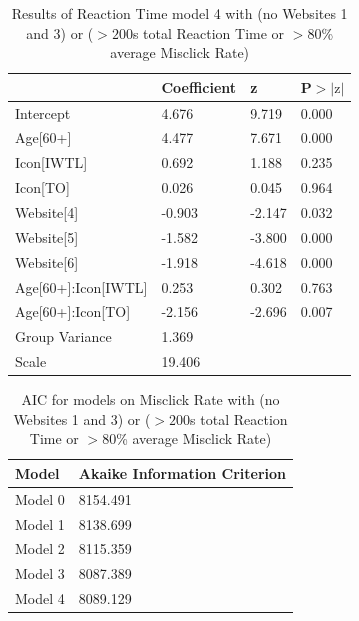 \documentclass[12pt,twoside]{reedthesis}
\begin{document}
\begin{table}[h!]
        \centering
        \begin{tabular}{| p{5cm} | p{2.5cm} | p{2.5cm} | p{2.5cm} |}
            \hline
            & Coefficient & z & P$>|\text{z}|$\\
            \hline
            Intercept & 4.676 & 9.719 & 0.000\\
            \hline
            Age[60+] & 4.477 & 7.671 & 0.000\\
            \hline
            Icon[IWTL] & 0.692 & 1.188 & 0.235\\
            \hline
            Icon[TO] & 0.026 & 0.045 & 0.964\\
            \hline
            Website[4] & -0.903 & -2.147 & 0.032\\
            \hline
            Website[5] & -1.582 & -3.800 & 0.000\\
            \hline
            Website[6] & -1.918 & -4.618 & 0.000\\
            \hline
            Age[60+]:Icon[IWTL] & 0.253 & 0.302 & 0.763\\
            \hline
            Age[60+]:Icon[TO] & -2.156 & -2.696 & 0.007\\
            Group Variance & 1.369 &&\\
            \hline
            Scale & 19.406 &&\\
            \hline
        \end{tabular}
        \caption{Results of Reaction Time model 4 with (no Websites 1 and 3) or ($>200$s total Reaction Time or $>80$\% average Misclick Rate)}
    \end{table}

\begin{table}[h!]
        \centering
        \begin{tabular}{| p{3.5cm} | p{7.5cm} |}
            \hline
            Model & Akaike Information Criterion\\
            \hline
            Model 0 & 8154.491\\
            \hline
            Model 1 & 8138.699\\
            \hline
            Model 2 & 8115.359\\
            \hline
            Model 3 & 8087.389\\
            \hline
            Model 4 & 8089.129\\
            \hline
        \end{tabular}
        \caption{AIC for models on Misclick Rate with (no Websites 1 and 3) or ($>200$s total Reaction Time or $>80$\% average Misclick Rate)}
    \end{table}
\end{document}
